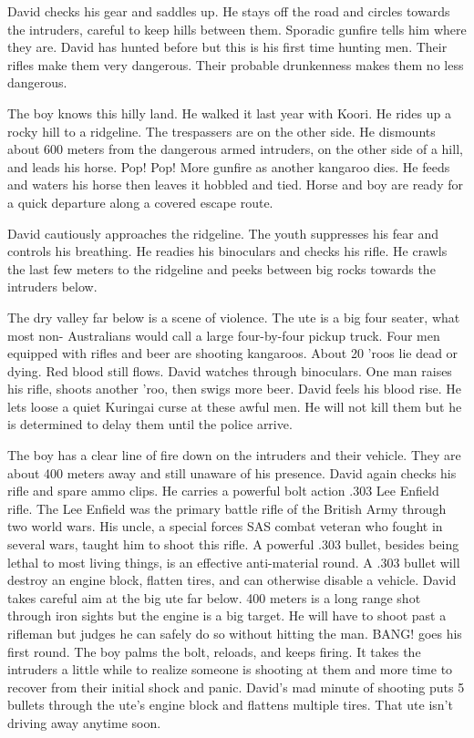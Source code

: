 David checks his gear and saddles up.  He stays off the road and circles towards the intruders, careful to keep hills between them.  Sporadic gunfire tells him where they are.  David has hunted before but this is his first time hunting men.  Their rifles make them very dangerous.  Their probable drunkenness makes them no less dangerous.

The boy knows this hilly land.  He walked it last year with Koori.  He rides up a rocky hill to a ridgeline.  The trespassers are on the other side.  He dismounts about 600 meters from the dangerous armed intruders, on the other side of a hill, and leads his horse. Pop! Pop! More gunfire as another kangaroo dies.   He feeds and waters his horse then leaves it hobbled and tied. Horse and boy are ready for a quick departure along a covered escape route.

David cautiously approaches the ridgeline.   The youth suppresses his fear and controls his breathing. He readies his binoculars and checks his rifle.  He crawls the last few meters to the ridgeline and peeks between big rocks towards the intruders below.

The dry valley far below is a scene of violence.  The ute is a big four seater, what most non- Australians would call a large four-by-four pickup truck.   Four men equipped with rifles and beer are shooting kangaroos.  About 20 'roos lie dead or dying.  Red blood still flows.  David watches through binoculars.  One man raises his rifle, shoots another 'roo, then swigs more beer.  David feels his blood rise.  He lets loose a quiet Kuringai curse at these awful men. He will not kill them but he is determined to delay them until the police arrive.

The boy has a clear line of fire down on the intruders and their vehicle.  They are about 400 meters away and still unaware of his presence.  David again checks his rifle and spare ammo clips.   He carries a powerful bolt action .303 Lee Enfield rifle. The Lee Enfield was the primary battle rifle of the British Army through two world wars. His uncle, a special forces SAS combat veteran who fought in several wars, taught him to shoot this rifle. A powerful .303 bullet, besides being lethal to most living things, is an effective anti-material round.  A .303 bullet will destroy an engine block, flatten tires, and can otherwise disable a vehicle. David takes careful aim at the big ute far below.  400 meters is a long range shot through iron sights but the engine is a big target.  He will have to shoot past a rifleman but judges he can safely do so without hitting the man.  BANG! goes his first round.  The boy palms the bolt, reloads, and keeps firing. It takes the intruders a little while to realize someone is shooting at them and more time to recover from their initial shock and panic.  David's mad minute of shooting puts 5 bullets through the ute's engine block and flattens multiple tires.  That ute isn't driving away anytime soon.

